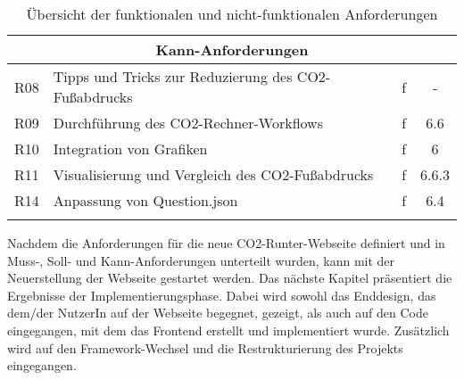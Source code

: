 \begin{longtable}{|c|l|c|c|}
    \hline
    \multicolumn{4}{|c|}{\textbf{Kann-Anforderungen}}                                                           \\
    \hline
    R08                  & Tipps und Tricks zur Reduzierung des CO2-Fußabdrucks & f            & -              \\
    \hline
    R09                  & Durchführung des CO2-Rechner-Workflows               & f            & 6.6            \\
    \hline
    R10                  & Integration von Grafiken                             & f            & 6              \\
    \hline
    R11                  & Visualisierung und Vergleich des CO2-Fußabdrucks     & f            & 6.6.3          \\
    \hline
    R14                  & Anpassung von Question.json                          & f            & 6.4            \\
    \hline
    \caption{Übersicht der funktionalen und nicht-funktionalen Anforderungen}
    \label{table:definied-tasks}
\end{longtable}


Nachdem die Anforderungen für die neue CO2-Runter-Webseite definiert und in Muss-, Soll- und Kann-Anforderungen unterteilt wurden, kann mit der Neuerstellung der Webseite gestartet werden. Das nächste Kapitel präsentiert die Ergebnisse der Implementierungsphase. Dabei wird sowohl das Enddesign, das dem/der NutzerIn auf der Webseite begegnet, gezeigt, als auch auf den Code eingegangen, mit dem das Frontend erstellt und implementiert wurde. Zusätzlich wird auf den Framework-Wechsel und die Restrukturierung des Projekts eingegangen.
